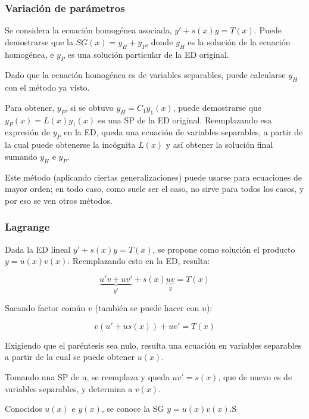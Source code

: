 \documentclass{article}
\begin{document}
\subsubsection{Variación de parámetros}

Se considera la ecuación homogénea asociada, $y' + s(x) y = T(x)$. Puede demostrarse que la $SG(x) = y_H + y_P$, donde $y_H$ es la solución de la ecuación homogénea, e $y_P$ es una solución particular de la ED original.

Dado que la ecuación homogénea es de variables separables, puede calcularse $y_H$ con el método ya visto.

Para obtener, $y_P$, si se obtuvo $y_H = C_1 y_1(x)$, puede demostrarse que $y_P(x) = L(x) y_1(x)$ es una SP de la ED original. Reemplazando esa expresión de $y_P$ en la ED, queda una ecuación de variables separables, a partir de la cual puede obtenerse la incógnita $L(x)$ y así obtener la solución final sumando $y_H$ e $y_P$.

Este método (aplicando ciertas generalizaciones) puede usarse para ecuaciones de mayor orden; en todo caso, como suele ser el caso, no sirve para todos los casos, y por eso se ven otros métodos.

\subsubsection{Lagrange}

Dada la ED lineal $y' + s(x) y = T(x)$, se propone como solución el producto $y = u(x) v(x)$. Reemplazando esto en la ED, resulta:

\begin{equation}
\underbrace{u'v + uv'}_{y'} + s(x) \underbrace{uv}_{y} = T(x)
\end{equation}

Sacando factor común $v$ (también se puede hacer con $u$):

\begin{equation}
v (u' + u s(x)) + uv' = T(x)
\end{equation}

Exigiendo que el paréntesis sea nulo, resulta una ecuación en variables separables a partir de la cual se puede obtener $u(x)$.

Tomando una SP de u, se reemplaza y queda $uv' = s(x)$, que de nuevo es de variables separables, y determina a $v(x)$.

Conocidos $u(x)$ e $y(x)$, se conoce la SG $y = u(x) v(x)$.S
\end{document}
